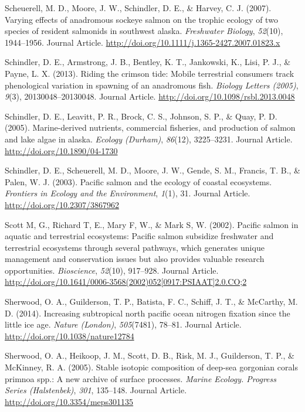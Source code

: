 \documentclass [11pt, proquest] {uwthesis}[2015/03/03]
\begin{document}
\hypertarget{ref-Scheuerell2007}{}
Scheuerell, M. D., Moore, J. W., Schindler, D. E., \& Harvey, C. J.
(2007). Varying effects of anadromous sockeye salmon on the trophic
ecology of two species of resident salmonids in southwest alaska.
\emph{Freshwater Biology}, \emph{52}(10), 1944--1956. Journal Article.
\url{http://doi.org/10.1111/j.1365-2427.2007.01823.x}

\hypertarget{ref-Schindler2013}{}
Schindler, D. E., Armstrong, J. B., Bentley, K. T., Jankowski, K., Lisi,
P. J., \& Payne, L. X. (2013). Riding the crimson tide: Mobile
terrestrial consumers track phenological variation in spawning of an
anadromous fish. \emph{Biology Letters (2005)}, \emph{9}(3),
20130048--20130048. Journal Article.
\url{http://doi.org/10.1098/rsbl.2013.0048}

\hypertarget{ref-Schindler2005}{}
Schindler, D. E., Leavitt, P. R., Brock, C. S., Johnson, S. P., \& Quay,
P. D. (2005). Marine-derived nutrients, commercial fisheries, and
production of salmon and lake algae in alaska. \emph{Ecology (Durham)},
\emph{86}(12), 3225--3231. Journal Article.
\url{http://doi.org/10.1890/04-1730}

\hypertarget{ref-Schindler2003}{}
Schindler, D. E., Scheuerell, M. D., Moore, J. W., Gende, S. M.,
Francis, T. B., \& Palen, W. J. (2003). Pacific salmon and the ecology
of coastal ecosystems. \emph{Frontiers in Ecology and the Environment},
\emph{1}(1), 31. Journal Article. \url{http://doi.org/10.2307/3867962}

\hypertarget{ref-Gende2002}{}
Scott M, G., Richard T, E., Mary F, W., \& Mark S, W. (2002). Pacific
salmon in aquatic and terrestrial ecosystems: Pacific salmon subsidize
freshwater and terrestrial ecosystems through several pathways, which
generates unique management and conservation issues but also provides
valuable research opportunities. \emph{Bioscience}, \emph{52}(10),
917--928. Journal Article.
\href{http://doi.org/10.1641/0006-3568(2002)052\%5B0917:PSIAAT\%5D2.0.CO;2}{http://doi.org/10.1641/0006-3568(2002)052{[}0917:PSIAAT{]}2.0.CO;2}

\hypertarget{ref-Sherwood2014}{}
Sherwood, O. A., Guilderson, T. P., Batista, F. C., Schiff, J. T., \&
McCarthy, M. D. (2014). Increasing subtropical north pacific ocean
nitrogen fixation since the little ice age. \emph{Nature (London)},
\emph{505}(7481), 78--81. Journal Article.
\url{http://doi.org/10.1038/nature12784}

\hypertarget{ref-Sherwood2005}{}
Sherwood, O. A., Heikoop, J. M., Scott, D. B., Risk, M. J., Guilderson,
T. P., \& McKinney, R. A. (2005). Stable isotopic composition of
deep-sea gorgonian corals primnoa spp.: A new archive of surface
processes. \emph{Marine Ecology. Progress Series (Halstenbek)},
\emph{301}, 135--148. Journal Article.
\url{http://doi.org/10.3354/meps301135}
\end{document}
